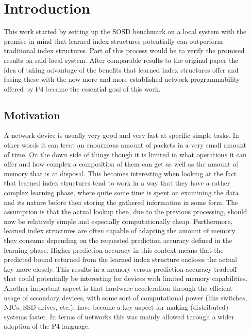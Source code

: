 
\chapter{Introduction}
\label{ch:introduction}
This work started by setting up the SOSD benchmark \cite{sosd-neurips} on a local system with the premise in mind that learned index structures potentially can outperform traditional index structures. Part of this process would be to verify the promised results on said local system. After comparable results to the original paper the idea of taking advantage of the benefits that learned index structures offer and fusing these with the now more and more established network programmability offered by P4 became the essential goal of this work.

\section{Motivation}
A network device is usually very good and very fast at specific simple tasks. In other words it can treat an enourmous amount of packets in a very small amount of time. On the down side of things though it is limited in what operations it can offer and how complex a composition of them can get as well as the amount of memory that is at disposal. This becomes interesting when looking at the fact that learned index structures tend to work in a way that they have a rather complex learning phase, where quite some time is spent on examining the data and its nature before then storing the gathered information in some form. The assumption is that the actual lookup then, due to the previous processing, should now be relatively simple and especially computationally cheap. Furthermore, learned index structures are often capable of adapting the amount of memory they consume depending on the requested prediction accuracy defined in the learning phase. Higher prediction accuracy in this context means that the predicted bound returned from the learned index structure encloses the actual key more closely. This results in a memory versus prediction accuracy tradeoff that could potentially be interesting for devices with limited memory capabilities. Another important aspect is that hardware acceleration through the efficient usage of secondary devices, with some sort of computational power (like switches, NICs, SSD drives, etc.), have become a key aspect for making (distributed) systems faster. In terms of networks this was mainly allowed through a wider adoption of the P4 \cite{p4-spec} language.\\

